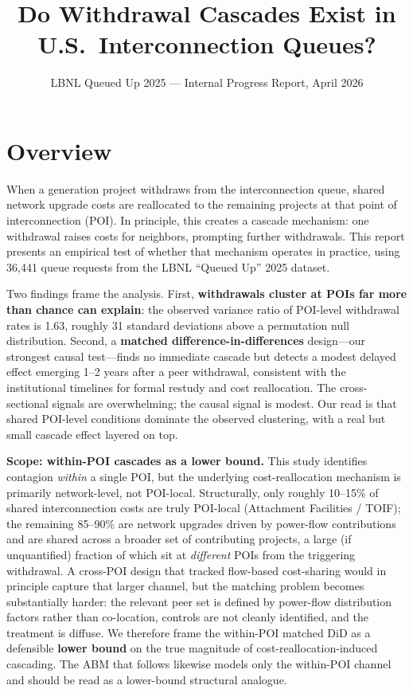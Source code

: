 \documentclass[10pt,letterpaper]{article}
\title{\vspace{-1.5cm}\textbf{Do Withdrawal Cascades Exist in U.S.\ Interconnection Queues?}\vspace{-0.3cm}}
\author{}
\date{\small LBNL Queued Up 2025 --- Internal Progress Report, April 2026}
\begin{document}
\maketitle
\thispagestyle{empty}

\section*{Overview}

When a generation project withdraws from the interconnection queue, shared network upgrade costs are reallocated to the remaining projects at that point of interconnection (POI). In principle, this creates a cascade mechanism: one withdrawal raises costs for neighbors, prompting further withdrawals. This report presents an empirical test of whether that mechanism operates in practice, using 36{,}441 queue requests from the LBNL ``Queued Up'' 2025 dataset.

Two findings frame the analysis. First, \textbf{withdrawals cluster at POIs far more than chance can explain}: the observed variance ratio of POI-level withdrawal rates is 1.63, roughly 31 standard deviations above a permutation null distribution. Second, a \textbf{matched difference-in-differences} design---our strongest causal test---finds no immediate cascade but detects a modest delayed effect emerging 1--2 years after a peer withdrawal, consistent with the institutional timelines for formal restudy and cost reallocation. The cross-sectional signals are overwhelming; the causal signal is modest. Our read is that shared POI-level conditions dominate the observed clustering, with a real but small cascade effect layered on top.

\textbf{Scope: within-POI cascades as a lower bound.} This study identifies contagion \emph{within} a single POI, but the underlying cost-reallocation mechanism is primarily network-level, not POI-local. Structurally, only roughly 10--15\% of shared interconnection costs are truly POI-local (Attachment Facilities / TOIF); the remaining 85--90\% are network upgrades driven by power-flow contributions and are shared across a broader set of contributing projects, a large (if unquantified) fraction of which sit at \emph{different} POIs from the triggering withdrawal. A cross-POI design that tracked flow-based cost-sharing would in principle capture that larger channel, but the matching problem becomes substantially harder: the relevant peer set is defined by power-flow distribution factors rather than co-location, controls are not cleanly identified, and the treatment is diffuse. We therefore frame the within-POI matched DiD as a defensible \textbf{lower bound} on the true magnitude of cost-reallocation-induced cascading. The ABM that follows likewise models only the within-POI channel and should be read as a lower-bound structural analogue.
\end{document}
